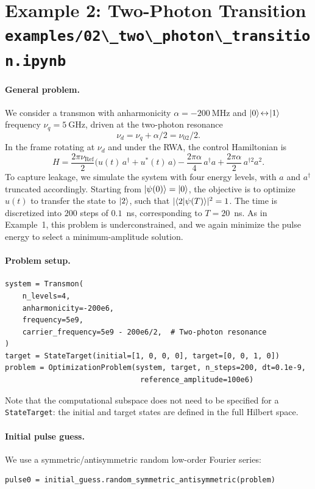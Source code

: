 \documentclass[a4paper,12pt]{article}
\DeclareMathOperator{\R}{Ref}
\newcommand{\mcode}[1]{\protect\lstinline[basicstyle=\color{black}\ttfamily]!#1!}
\begin{document}
\section*{Example 2: Two-Photon Transition\\
\mcode{examples/02\_two\_photon\_transition.ipynb}}
{}

\paragraph*{General problem.}
We consider a transmon with anharmonicity $\alpha=-200~\mathrm{MHz}$ and
$\ket{0}\!\leftrightarrow\!\ket{1}$ frequency $\nu_q=5~\mathrm{GHz}$, driven
at the two-photon resonance
\[
\nu_d=\nu_q+\alpha/2=\nu_{02}/2.
\]
In the frame rotating at $\nu_d$ and under the RWA, the control Hamiltonian is
\[
    H = \frac{2\pi \nu_{\R}}{2}\big( u(t) \, a^{\dagger} + u^{*}(t) \, a \big)
      - \frac{2\pi\alpha}{4} \, a^{\dagger} a
      + \frac{2\pi \alpha}{2} \, a^{\dagger 2} a^{2}.
\]
To capture leakage, we simulate the system with four energy levels, with $a$
and $a^\dagger$ truncated accordingly. Starting from $\ket{\psi(0)}=\ket{0}$,
the objective is to optimize $u(t)$ to transfer the state to $\ket{2}$, such
that $|\!\braket{2|\psi(T)}\!|^2=1$. The time is discretized into $200$ steps
of $0.1$~ns, corresponding to $T=20$~ns. As in Example~1, this problem is
underconstrained, and we again minimize the pulse energy to select a
minimum-amplitude solution.

\paragraph*{Problem setup.}
\begin{lstlisting}
system = Transmon(
    n_levels=4,
    anharmonicity=-200e6,
    frequency=5e9,
    carrier_frequency=5e9 - 200e6/2,  # Two-photon resonance
)
target = StateTarget(initial=[1, 0, 0, 0], target=[0, 0, 1, 0])
problem = OptimizationProblem(system, target, n_steps=200, dt=0.1e-9,
                               reference_amplitude=100e6)
\end{lstlisting}
Note that the computational subspace does not need to be specified for a
\mcode{StateTarget}: the initial and target states are defined in the full
Hilbert space.

\paragraph*{Initial pulse guess.} We use a symmetric/antisymmetric random
low-order Fourier series:
\begin{lstlisting}
pulse0 = initial_guess.random_symmetric_antisymmetric(problem)
\end{lstlisting}
\end{document}
